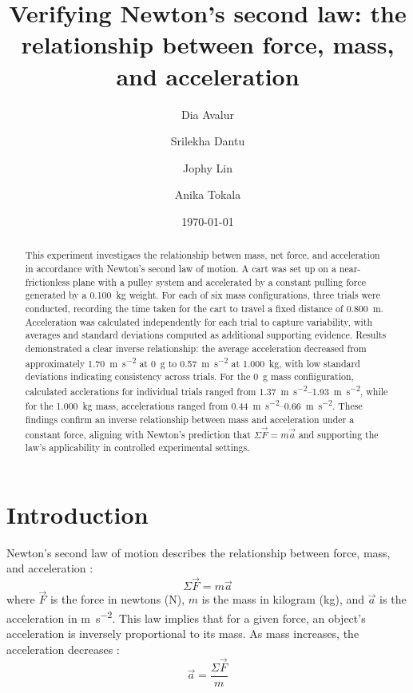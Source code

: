 ﻿\documentclass[reprint,amsmath,amssymb,aps]{revtex4-2}
\begin{document}
\title{Verifying Newton's second law: the relationship between force, mass, and acceleration}
\author{Dia Avalur}
\author{Srilekha Dantu}
\author{Jophy Lin}
\author{Anika Tokala}
\date{\today}

\begin{abstract}
This experiment investigaes the relationship betwen mass, net force, and acceleration in accordance with Newton's second law of motion. A cart was set up on a near-frictionless plane with a pulley system and accelerated by a constant pulling force generated by a \qty{0.100}{\kilo\gram} weight. For each of six mass configurations, three trials were conducted, recording the time taken for the cart to travel a fixed distance of \qty{0.800}{\meter}. Acceleration was calculated independently for each trial to capture variability, with averages and standard deviations computed as additional supporting evidence. Results demonstrated a clear inverse relationship: the average acceleration decreased from approximately \qty{1.70}{\meter\per\second\squared} at \qty{0}{\gram} to \qty{0.57}{\meter\per\second\squared} at \qty{1.000}{\kilo\gram}, with low standard deviations indicating consistency across trials. For the \qty{0}{\gram} mass confiiguration, calculated acclerations for individual trials ranged from \qtyrange{1.37}{1.93}{\meter\per\second\squared}, while for the \qty{1.000}{\kilo\gram} mass, accelerations ranged from \qtyrange{0.44}{0.66}{\meter\per\second\squared}. These findings confirm an inverse relationship between mass and acceleration under a constant force, aligning with Newton's prediction that $\Sigma \vec{F} = m\vec{a}$ and supporting the law's applicability in controlled experimental settings.
\end{abstract}


\maketitle





\section{Introduction}
Newton’s second law of motion describes the relationship between force, mass, and acceleration \cite{knight2017physics}: 
\begin{equation}
\Sigma \vec{F} = m \vec{a}
\label{eq:n2l}
\end{equation}
where $\vec{F}$ is the force in newtons (\unit{\newton}), $m$ is the mass in kilogram (\unit{\kilo\gram}), and $\vec{a}$ is the acceleration in \unit{\meter\per\second\squared}. This law implies that for a given force, an object’s acceleration is inversely proportional to its mass. As mass increases, the acceleration decreases \cite{knight2017physics}:   
\begin{equation}
\vec{a} = \dfrac{\Sigma \vec{F}}{m}
\label{eq:n2lb}
\end{equation}
\end{document}
